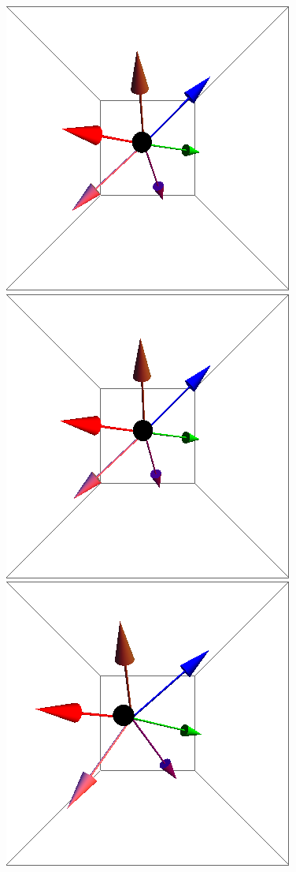 \documentclass{article}
\begin{document}
\begin{figure}[ht]
\centering
\includegraphics[scale=0.3]{100/1S005to000R.png}
\includegraphics[scale=0.3]{100/41S005to000R.png}
\includegraphics[scale=0.3]{100/46S005to000R.png}

\end{figure}
\end{document}

